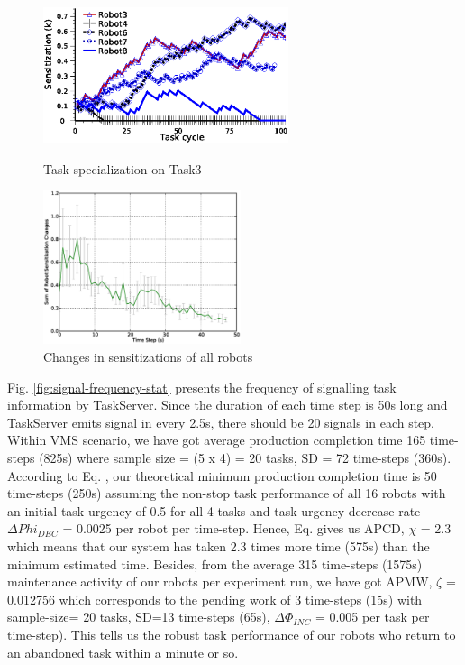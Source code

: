 \documentclass{llncs}
\begin{document}
\begin{figure}
\begin{minipage}[t]{0.48\linewidth}
\centering
\includegraphics[height=4cm, angle=0]{images/TaskSpecialization-task3-10may-1.eps}
\caption{\small Task specialization on Task3}
\label{fig:single-robot-sensitizations} %
\end{minipage} 
\hspace{0.5cm}
\begin{minipage}[t]{0.48\linewidth}
\centering
\includegraphics[height=4.5cm, angle=0]
{images/RobotSensitizationStat-Total-50steps.eps}
\caption{\small Changes in sensitizations of all robots}
\label{fig:sensitization-stat} %
\end{minipage}
\end{figure}
Fig. \ref{fig:signal-frequency-stat} presents the frequency of signalling task information by TaskServer. Since the duration of each time step is 50s long and TaskServer emits signal in every 2.5s, there should be 20 signals in each step.\\
Within VMS scenario, we have got average production completion time 165 time-steps (825s) where sample size = (5 x 4) =  20 tasks, SD = 72 time-steps (360s). According to Eq. , our theoretical minimum  production completion time is 50 time-steps (250s) assuming the non-stop task performance of all 16 robots with an initial task urgency of 0.5 for all 4 tasks and  task urgency decrease rate $\Delta Phi_{DEC}$ = 0.0025 per robot per time-step. Hence, Eq. gives us APCD, $\chi$ = 2.3 which means that our system has taken 2.3 times more time (575s) than the minimum estimated time. Besides,  from the average 315 time-steps (1575s) maintenance activity of our robots per experiment run, we have got  APMW, $\zeta$ = 0.012756  which corresponds to the pending work of 3 time-steps (15s) with sample-size= 20 tasks, SD=13 time-steps (65s), $\Delta \Phi_{INC}$ = 0.005 per task per time-step). This tells us the robust task performance of our robots who return to an abandoned task within a minute or so.
\end{document}

